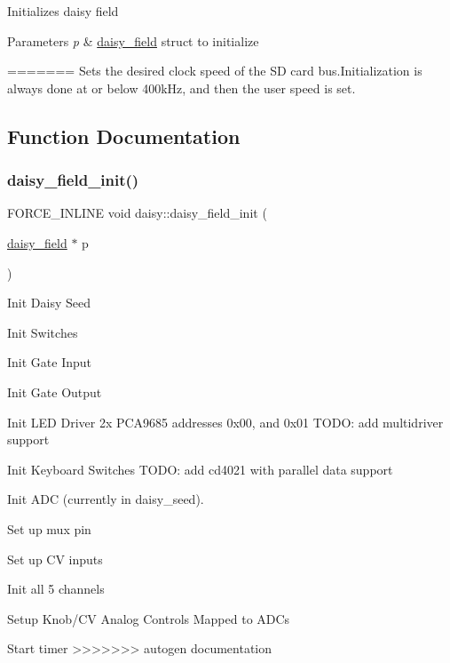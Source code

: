 Initializes daisy field 
\begin{DoxyParams}{Parameters}
{\em p} & \hyperlink{structdaisy_1_1daisy__field}{daisy\+\_\+field} struct to initialize \\
\hline
\end{DoxyParams}
=======
Sets the desired clock speed of the SD card bus.\+Initialization is always done at or below 400k\+Hz, and then the user speed is set. 

\subsection{Function Documentation}
\mbox{\label{namespacedaisy_a49462ee18989a9c75b51b2cf864f3536}} 
\subsubsection{\texorpdfstring{daisy\+\_\+field\+\_\+init()}{daisy\_field\_init()}}
{\footnotesize\ttfamily F\+O\+R\+C\+E\+\_\+\+I\+N\+L\+I\+NE void daisy\+::daisy\+\_\+field\+\_\+init (\begin{DoxyParamCaption}\item[{\hyperlink{structdaisy_1_1daisy__field}{daisy\+\_\+field} $\ast$}]{p }\end{DoxyParamCaption})}

Init Daisy Seed

Init Switches

Init Gate Input

Init Gate Output

Init L\+ED Driver 2x P\+C\+A9685 addresses 0x00, and 0x01 T\+O\+DO\+: add multidriver support

Init Keyboard Switches T\+O\+DO\+: add cd4021 with parallel data support

Init A\+DC (currently in daisy\+\_\+seed).

Set up mux pin

Set up CV inputs

Init all 5 channels

Setup Knob/\+CV Analog Controls Mapped to A\+D\+Cs

Start timer
>>>>>>> autogen documentation
